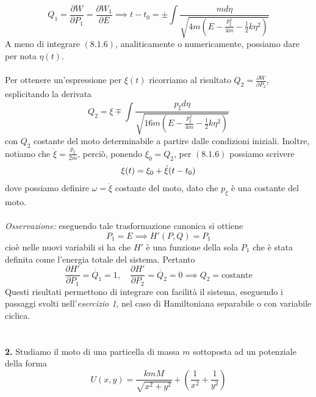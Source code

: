 \documentclass{article}
\begin{document}
\begin{equation}
    Q_1 = \frac{\partial W}{\partial P_1} = \frac{\partial W_1}{\partial E} \implies t - t_0 = \pm \int \frac{md\eta}{\sqrt{4m\left( E - \frac{p^2_\xi}{4m} -\frac{1}{2}k\eta^2 \right)}} \tag{8.1.6}
\end{equation}
A meno di integrare $(8.1.6)$, analiticamente o numericamente, possiamo dare per nota $\eta (t)$. \\ \\
Per ottenere un'espressione per $\xi (t)$ ricorriamo al risultato $Q_2 = \frac{\partial W}{\partial P_2}$, esplicitando la derivata
\begin{equation}
     Q_2 = \xi \mp \int \frac{p_\xi d\eta}{\sqrt{16m\left( E - \frac{p^2_\xi}{4m} -\frac{1}{2}k\eta^2 \right)}} \tag{8.1.7}  
\end{equation}
con $Q_2$ costante del moto determinabile a partire dalle condizioni iniziali. Inoltre, notiamo che $\dot{\xi} = \frac{p_\xi}{2m}$, perciò, ponendo $\xi_0 = Q_2$, per $(8.1.6)$ possiamo scrivere
\begin{equation}
    \xi (t) = \xi_0 + \dot{\xi}(t - t_0) \notag
\end{equation}
dove possiamo definire $\omega = \dot{\xi}$ costante del moto, dato che $p_\xi$ è una costante del moto. \\ \\
\textit{Osservazione:} eseguendo tale trasformazione canonica si ottiene
\begin{equation}
    P_1 = E \implies H'(P, Q) = P_1 \tag{8.1.8}
\end{equation}
cioè nelle nuovi variabili si ha che $H'$ è una funzione della sola $P_1$ che è stata definita come l'energia totale del sistema. Pertanto
\begin{equation}
    \frac{\partial H'}{\partial P_1} = \dot{Q_1} = 1, \quad \frac{\partial H'}{\partial P_2} = \dot{Q_2} = 0 \implies Q_2 = \text{costante} \tag{8.1.9}
\end{equation}
Questi risultati permettono di integrare con facilità il sistema, eseguendo i passaggi svolti nell'\textit{esercizio 1}, nel caso di Hamiltoniana separabile o con variabile ciclica. \\ \\ \\
\textbf{2.} Studiamo il moto di una particella di massa $m$ sottoposta ad un potenziale della forma
\begin{equation}
    U(x, y) = \frac{kmM}{\sqrt{x^2 + y^2}} + \left( \frac{1}{x^2} + \frac{1}{y^2} \right) \tag{8.2.1}
\end{equation}
\end{document}

